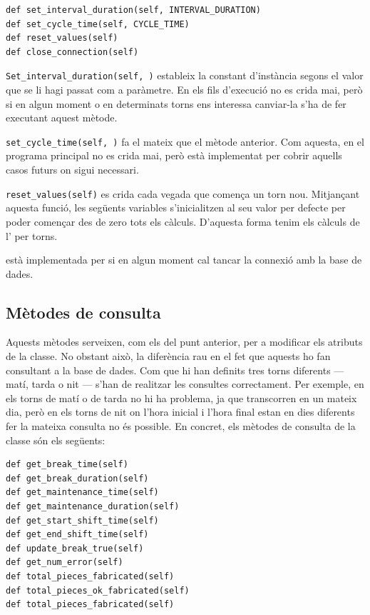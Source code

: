 \documentclass{tfgitic}[2022/06/30]
\begin{document}
\begin{lstlisting}[style=Python]
def set_interval_duration(self, INTERVAL_DURATION)
def set_cycle_time(self, CYCLE_TIME)
def reset_values(self)
def close_connection(self)
\end{lstlisting}

\texttt{Set\_interval\_duration(self, )} estableix la constant d'instància \texttt{} segons el valor que se li hagi passat com a paràmetre. En els fils d'execució no es crida mai, però si en algun moment o en determinats torns ens interessa canviar-la s'ha de fer executant aquest mètode.

\texttt{set\_cycle\_time(self, )} fa el mateix que el mètode anterior. Com aquesta, en el programa principal no es crida mai, però està implementat per cobrir aquells casos futurs on sigui necessari.
   
\texttt{reset\_values(self)} es crida cada vegada que comença un torn nou. Mitjançant aquesta funció, les següents variables s'inicialitzen al seu valor per defecte per poder començar des de zero tots els càlculs. D'aquesta forma tenim els càlculs de l' per torns.
   
 està implementada per si en algun moment cal tancar la connexió amb la base de dades.

\subsection{Mètodes de consulta}
Aquests mètodes serveixen, com els del punt anterior, per a modificar els atributs de la classe. No obstant això, la diferència rau en el fet que aquests ho fan consultant a la base de dades. Com que hi han definits tres torns diferents --- matí, tarda o nit --- s'han de realitzar les consultes correctament. Per exemple, en els torns de matí o de tarda no hi ha problema, ja que transcorren en un mateix dia, però en els torns de nit on l'hora inicial i l'hora final estan en dies diferents fer la mateixa consulta no és possible. En concret, els mètodes de consulta de la classe són els següents:

\begin{lstlisting}[style=Python]
def get_break_time(self)
def get_break_duration(self)
def get_maintenance_time(self)
def get_maintenance_duration(self)
def get_start_shift_time(self)
def get_end_shift_time(self)
def update_break_true(self)
def get_num_error(self)
def total_pieces_fabricated(self)
def total_pieces_ok_fabricated(self)
def total_pieces_fabricated(self)
\end{lstlisting}
\end{document}
